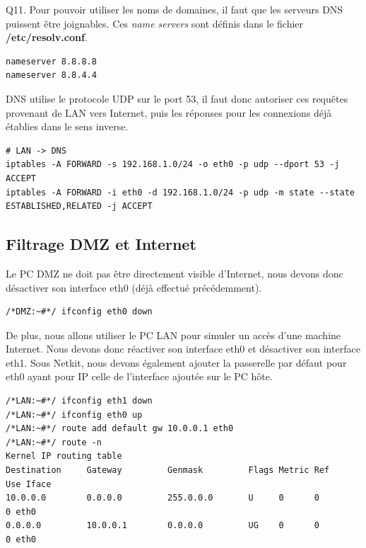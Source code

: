 \documentclass[frenchb, 11pt]{article}
\newlength{\leftbarwidth}
\newlength{\leftbarsep}
\newcommand*{\leftbarcolorcmd}{\color{leftbarcolor}} %
\renewenvironment{leftbar}{%
    \def\FrameCommand{{\leftbarcolorcmd{\vrule width \leftbarwidth\relax\hspace {\leftbarsep}}}}%
    \MakeFramed {\advance \hsize -\width \FrameRestore }%
}{%
    \endMakeFramed
}
\begin{document}
\begin{leftbar}
	\noindent Q11. Pour pouvoir utiliser les noms de domaines, il faut que les serveurs DNS puissent être joignables. Ces \emph{name servers} sont définis dans le fichier \textbf{/etc/resolv.conf}.
	\begin{lstlisting}[caption=Exemple de nameservers (Google Public DNS) dans /etc/resolv.conf, numbers=none]
nameserver 8.8.8.8
nameserver 8.8.4.4
	\end{lstlisting}
	DNS utilise le protocole UDP sur le port 53, il faut donc autoriser ces requêtes provenant de LAN vers Internet, puis les réponses pour les connexions déjà établies dans le sens inverse.
	\begin{lstlisting}[numbers=none]
# LAN -> DNS
iptables -A FORWARD -s 192.168.1.0/24 -o eth0 -p udp --dport 53 -j ACCEPT
iptables -A FORWARD -i eth0 -d 192.168.1.0/24 -p udp -m state --state ESTABLISHED,RELATED -j ACCEPT
	\end{lstlisting}
\end{leftbar}

\subsection{Filtrage DMZ et Internet}
Le PC DMZ ne doit pas être directement visible d'Internet, nous devons donc désactiver son interface eth0 (déjà effectué précédemment).
\begin{lstlisting}
/*DMZ:~#*/ ifconfig eth0 down
\end{lstlisting}
De plus, nous allons utiliser le PC LAN pour simuler un accès d'une machine Internet. Nous devons donc réactiver son interface eth0 et désactiver son interface eth1. Sous Netkit, nous devons également ajouter la passerelle par défaut pour eth0 ayant pour IP celle de l'interface ajoutée sur le PC hôte.
\begin{lstlisting}
/*LAN:~#*/ ifconfig eth1 down
/*LAN:~#*/ ifconfig eth0 up
/*LAN:~#*/ route add default gw 10.0.0.1 eth0
/*LAN:~#*/ route -n
Kernel IP routing table
Destination     Gateway         Genmask         Flags Metric Ref    Use Iface
10.0.0.0        0.0.0.0         255.0.0.0       U     0      0        0 eth0
0.0.0.0         10.0.0.1        0.0.0.0         UG    0      0        0 eth0
\end{lstlisting}
\end{document}
